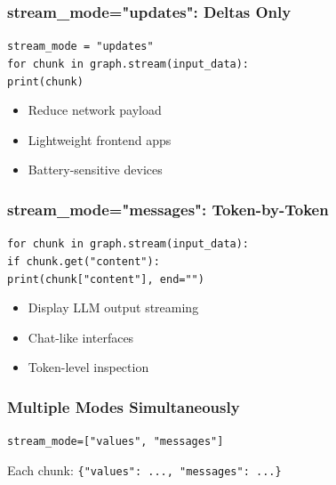 \documentclass[aspectratio=169,11pt]{beamer}
\begin{document}
\begin{frame}
\frametitle{stream\_mode="updates": Deltas Only}
\begin{tipbox}[Example]
\texttt{stream\_mode = "updates"}\\
\texttt{for chunk in graph.stream(input\_data):}\\
\quad\texttt{print(chunk)}
\end{tipbox}
\vspace{0.1cm}
\begin{tipbox}
\setlength{\itemsep}{1pt}
\begin{itemize}
\item Reduce network payload
\item Lightweight frontend apps
\item Battery-sensitive devices
\end{itemize}
\end{tipbox}
\end{frame}

\begin{frame}
\frametitle{stream\_mode="messages": Token-by-Token}
\begin{tipbox}[Example]
\texttt{for chunk in graph.stream(input\_data):}\\
\quad\texttt{if chunk.get("content"):}\\
\quad\quad\texttt{print(chunk["content"], end="")}
\end{tipbox}
\vspace{0.1cm}
\begin{tipbox}
\setlength{\itemsep}{1pt}
\begin{itemize}
\item Display LLM output streaming
\item Chat-like interfaces
\item Token-level inspection
\end{itemize}
\end{tipbox}
\end{frame}

\begin{frame}
\frametitle{Multiple Modes Simultaneously}
\begin{tipbox}
\texttt{stream\_mode=["values", "messages"]}
\end{tipbox}
\vspace{0.1cm}
\begin{warningbox}
Each chunk: \texttt{\{"values": ..., "messages": ...\}}
\end{warningbox}
\end{frame}
\end{document}

